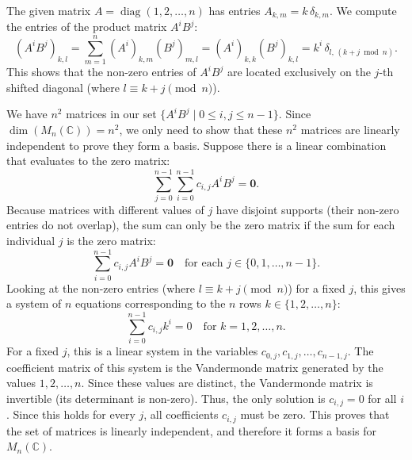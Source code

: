 \documentclass{article}
\begin{document}
\begin{enumerate}[label=\fbox{\arabic*}]
        The given matrix $A = \operatorname{diag}(1, 2, \dots, n)$ has entries $A_{k, m} = k \, \delta_{k, m}$.
        We compute the entries of the product matrix $A^i B^j$:
        \[
          (A^i B^j)_{k, l} = \sum_{m=1}^n (A^i)_{k, m} (B^j)_{m, l} = (A^i)_{k, k} (B^j)_{k, l} = k^i \, \delta_{l, \, (k+j \bmod n)}.
        \]
        This shows that the non-zero entries of $A^i B^j$ are located exclusively on the $j$-th shifted diagonal (where $l \equiv k+j \pmod n$).
        
        We have $n^2$ matrices in our set $\{ A^i B^j \mid 0 \le i, j \le n-1 \}$. Since $\dim(M_n(\mathbb{C})) = n^2$, we only need to show that these $n^2$ matrices are linearly independent to prove they form a basis.
        Suppose there is a linear combination that evaluates to the zero matrix:
        \[
          \sum_{j=0}^{n-1} \sum_{i=0}^{n-1} c_{i, j} A^i B^j = \bm{0}.
        \]
        Because matrices with different values of $j$ have disjoint supports (their non-zero entries do not overlap), the sum can only be the zero matrix if the sum for each individual $j$ is the zero matrix:
        \[
          \sum_{i=0}^{n-1} c_{i, j} A^i B^j = \bm{0} \quad \text{for each } j \in \{0, 1, \dots, n-1\}.
        \]
        Looking at the non-zero entries (where $l \equiv k+j \pmod n$) for a fixed $j$, this gives a system of $n$ equations corresponding to the $n$ rows $k \in \{1, 2, \dots, n\}$:
        \[
          \sum_{i=0}^{n-1} c_{i, j} k^i = 0 \quad \text{for } k = 1, 2, \dots, n.
        \]
        For a fixed $j$, this is a linear system in the variables $c_{0, j}, c_{1, j}, \dots, c_{n-1, j}$. The coefficient matrix of this system is the Vandermonde matrix generated by the values $1, 2, \dots, n$.
        Since these values are distinct, the Vandermonde matrix is invertible (its determinant is non-zero).
        Thus, the only solution is $c_{i, j} = 0$ for all $i$.
        Since this holds for every $j$, all coefficients $c_{i, j}$ must be zero. 
        This proves that the set of matrices is linearly independent, and therefore it forms a basis for $M_n(\mathbb{C})$.
\end{enumerate}
\end{document}
